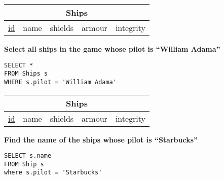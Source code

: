 \documentclass{beamer}
\begin{document}
\begin{frame}[fragile]
\begin{tabular}{|c|c|c|c|c|}
\hline
\multicolumn{5}{|c|}{\textbf{Ships}} \\
\hline
\underline{id} & name & shields & armour & integrity \\
\hline
\end{tabular}

\vspace{0.25cm}
\textbf{Select all ships in the game whose pilot is ``William Adama''}
\pause
\begin{lstlisting}
SELECT *
FROM Ships s
WHERE s.pilot = 'William Adama'
\end{lstlisting}

\end{frame}

\begin{frame}[fragile]
\begin{tabular}{|c|c|c|c|c|}
\hline
\multicolumn{5}{|c|}{\textbf{Ships}} \\
\hline
\underline{id} & name & shields & armour & integrity \\
\hline
\end{tabular}

\vspace{0.25cm}
\textbf{Find the name of the ships whose pilot is ``Starbucks''}
\pause
\begin{lstlisting}
SELECT s.name
FROM Ship s
where s.pilot = 'Starbucks'
\end{lstlisting}

\end{frame}
\end{document}

